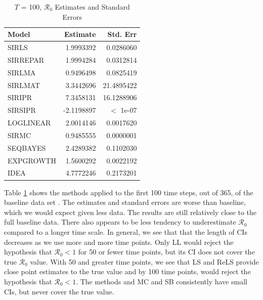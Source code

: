 \documentclass[12pt]{article}
\newcommand{\rr}{\ensuremath{\mathcal{R}_0}}
\begin{document}
\begin{table}[H]
	

	\centering
	\begin{tabular}[t]{l|r|r}
		\hline
		Model & Estimate & Std. Err\\
		\hline
		SIRLS & 1.9993392 & 0.0286060\\
		\hline
		SIRREPAR & 1.9994284 & 0.0312814\\
		\hline
		SIRLMA & 0.9496498 & 0.0825419\\
		\hline
		SIRLMAT & 3.3442696 & 21.4895422\\
		\hline
		SIRIPR & 7.3458131 & 16.1288906\\
		\hline
		SIRSIPR & -2.1198897 & $<$ 1e-07\\
		\hline
		LOGLINEAR & 2.0014146 & 0.0017620\\
		\hline
		SIRMC & 0.9485555 & 0.0000001\\
		\hline
		SEQBAYES & 2.4289382 & 0.1102030\\
		\hline
		EXPGROWTH & 1.5600292 & 0.0022192\\
		\hline
		IDEA & 4.7772246 & 0.2173201\\
		\hline
	\end{tabular}
        \caption{ $T$ = 100, $\rr$ Estimates and Standard Errors}\label{tab:time-res1}
\end{table}

Table \ref{tab:time-res1} shows the methods applied to the first 100 time steps, out of 365, of the baseline data set . The estimates and standard errors are worse than baseline, which we would expect given less data. The results are still relatively close to the full baseline data. There also appears to be less tendency to underestimate $\rr$ compared to a longer time scale.  In general, we see that that the length of CIs decreases as we use more and more time points.  Only LL would reject the hypothesis that $\rr < 1$ for 50 or fewer time points, but its CI does not cover the true $\rr$ value.  With 50 and greater time points, we see that LS and ReLS provide close point estimates to the true value and by 100 time points, would reject the hypothesis that $\rr < 1$.  The methods and MC and SB consistently have small CIs, but never cover the true value.
\end{document}

